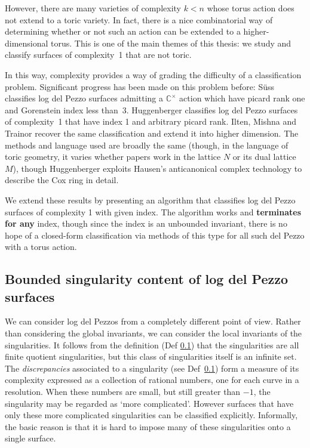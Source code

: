 \documentclass[12pt]{amsart}
\theoremstyle{definition}
\theoremstyle{definition}
\theoremstyle{definition}
\theoremstyle{definition}
\theoremstyle{definition}
\theoremstyle{definition}
\theoremstyle{definition}
\theoremstyle{definition}
\begin{document}
However, there are many varieties of complexity $k<n$ whose torus action does not extend to a toric variety. In fact, there is a nice combinatorial way of determining whether or not such an action can be extended to a higher-dimensional torus. This is one of the main themes of this thesis: we study
and classify surfaces of complexity~1 that are not toric.

In this way, complexity provides a way of grading the difficulty of a classification problem. Significant progress has been made on this problem before: S\"{u}ss \cite{Suss} classifies log del Pezzo surfaces admitting a $\mathbb{C}^\times$ action which have picard rank one and Gorenstein index less than~3. Huggenberger \cite{Huggenberger} classifies log del Pezzo surfaces of complexity~1 that have index 1 and arbitrary picard rank. Ilten, Mishna and Trainor \cite{IMT} recover the same classification and extend it into higher dimension. The methods and language used are broadly the same (though, in the language of toric geometry, it varies whether papers work in the lattice $N$ or its dual lattice $M$), though Huggenberger exploits Hausen's anticanonical complex technology to describe the Cox ring in detail. 

We extend these results by presenting an algorithm that classifies
log del Pezzo surfaces of complexity 1 with given index.
The algorithm works and \textbf{terminates for any} index, 
though since the index is an unbounded invariant, there is no hope of 
a closed-form classification via methods of this type for all such del Pezzo with a torus action.



\subsection{Bounded singularity content of log del Pezzo surfaces}

We can consider log del Pezzos from a completely different point of view. Rather than considering the global invariants, we can consider the local invariants of the singularities. 
It follows from the definition (Def \ref{}) that the singularities
are all finite quotient singularities, but this class of singularities itself is an infinite set. 
The {\em discrepancies} associated to a singularity (see Def~\ref{}) form a measure of
its complexity expressed as a collection of rational numbers, one for each curve in a resolution. 
When these numbers are small, but still greater than $-1$, the singularity may be regarded as `more complicated'. 
However surfaces that have only these more complicated singularities can be classified explicitly. Informally,
the basic reason is that it is hard to impose many of these singularities onto a single surface.
\end{document}
